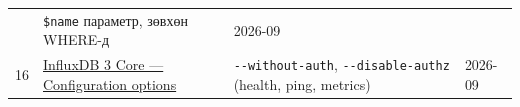 \begin{longtable}[]{@{}llll@{}}
\begin{minipage}[t]{0.22\columnwidth}
\end{minipage} & \begin{minipage}[t]{0.22\columnwidth}\raggedright
\texttt{\$name} параметр, зөвхөн WHERE-д\strut
\end{minipage} & \begin{minipage}[t]{0.22\columnwidth}\raggedright
2026-09\strut
\end{minipage}\tabularnewline
\begin{minipage}[t]{0.22\columnwidth}\raggedright
16\strut
\end{minipage} & \begin{minipage}[t]{0.22\columnwidth}\raggedright
\href{https://docs.influxdata.com/influxdb3/core/reference/config-options/}{InfluxDB 3 Core --- Configuration options}\strut
\end{minipage} & \begin{minipage}[t]{0.22\columnwidth}\raggedright
\texttt{-\/-without-auth}, \texttt{-\/\allowbreak{}-disable-authz} (health, ping, metrics)\strut
\end{minipage} & \begin{minipage}[t]{0.22\columnwidth}\raggedright
2026-09\strut
\end{minipage}\tabularnewline
\bottomrule
\end{longtable}\endgroup
